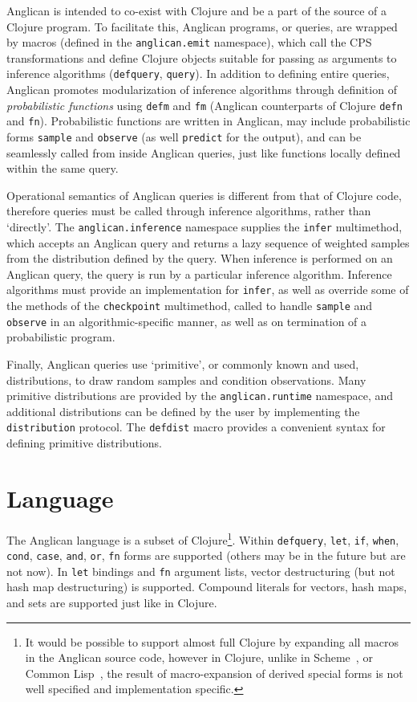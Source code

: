 \documentclass[preprint]{sigplanconf}
\begin{document}
Anglican is intended to co-exist with Clojure and be a part of
the source of a Clojure program. To facilitate this, Anglican
programs, or queries, are wrapped by macros (defined in the
\texttt{anglican.emit} namespace), which call the CPS
transformations and define Clojure objects suitable for passing
as arguments to inference algorithms (\texttt{defquery},
\texttt{query}). In addition to defining entire queries,
Anglican promotes modularization of inference algorithms through
definition of \textit{probabilistic functions} using
\texttt{defm} and \texttt{fm} (Anglican counterparts of Clojure
\texttt{defn} and \texttt{fn}). Probabilistic functions are
written in Anglican, may include probabilistic forms
\texttt{sample} and \texttt{observe} (as well \texttt{predict}
for the output), and can be seamlessly called from inside
Anglican queries, just like functions locally defined within the
same query.

Operational semantics of Anglican queries is different from that
of Clojure code, therefore queries must be called through
inference algorithms, rather than `directly'.  The
\texttt{anglican.inference} namespace supplies the
\texttt{infer} multimethod, which accepts an Anglican query and
returns a lazy sequence of weighted samples from the
distribution defined by the query.  When inference
is performed on an Anglican query, the query is run by a
particular inference algorithm. Inference algorithms must
provide an implementation for \texttt{infer}, as well as
override some of the methods of the \texttt{checkpoint}
multimethod, called to handle \texttt{sample} and
\texttt{observe} in an algorithmic-specific manner, as well
as on termination of a probabilistic program.

Finally, Anglican queries use `primitive', or commonly known
and used, distributions, to draw random samples and condition
observations. Many primitive distributions are provided by the
\texttt{anglican.runtime} namespace, and additional
distributions can be defined by the user by implementing the
\texttt{distribution} protocol. The \texttt{defdist} macro
provides a convenient syntax for defining primitive distributions.

\section{Language}

The Anglican language is a subset of Clojure\footnote{It would be
possible to support almost full Clojure by expanding all macros
in the Anglican source code, however in Clojure, unlike in
Scheme~\cite{SDF+10}, or Common Lisp~\cite{PC94}, the result
of macro-expansion of derived special forms is not well
specified and implementation specific.}.  Within \texttt{defquery},
\texttt{let}, \texttt{if}, \texttt{when}, \texttt{cond},
\texttt{case}, \texttt{and}, \texttt{or}, \texttt{fn} forms are
supported (others may be in the future but are not now). 
In \texttt{let} bindings and \texttt{fn} argument lists,
vector destructuring (but not hash map destructuring) is
supported. Compound literals for vectors, hash maps, and
sets are supported just like in Clojure.
\end{document}
